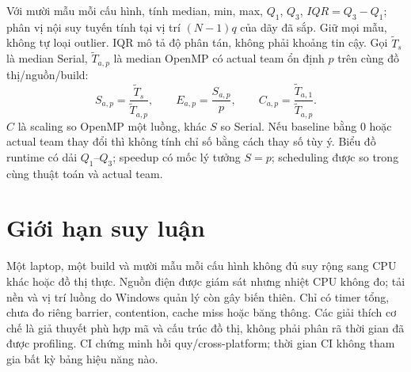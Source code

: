 Với mười mẫu mỗi cấu hình, tính median, min, max, $Q_1$, $Q_3$, $IQR=Q_3-Q_1$; phân vị nội suy tuyến tính tại vị trí $(N-1)q$ của dãy đã sắp. Giữ mọi mẫu, không tự loại outlier. IQR mô tả độ phân tán, không phải khoảng tin cậy. Gọi $\widetilde T_s$ là median Serial, $\widetilde T_{a,p}$ là median OpenMP có actual team ổn định $p$ trên cùng đồ thị/nguồn/build:
\[
S_{a,p}=\frac{\widetilde T_s}{\widetilde T_{a,p}},\qquad
E_{a,p}=\frac{S_{a,p}}p,\qquad
C_{a,p}=\frac{\widetilde T_{a,1}}{\widetilde T_{a,p}}.
\]
$C$ là scaling so OpenMP một luồng, khác $S$ so Serial. Nếu baseline bằng 0 hoặc actual team thay đổi thì không tính chỉ số bằng cách thay số tùy ý. Biểu đồ runtime có dải $Q_1$--$Q_3$; speedup có mốc lý tưởng $S=p$; scheduling được so trong cùng thuật toán và actual team.

\section{Giới hạn suy luận}
Một laptop, một build và mười mẫu mỗi cấu hình không đủ suy rộng sang CPU khác hoặc đồ thị thực. Nguồn điện được giám sát nhưng nhiệt CPU không đo; tải nền và vị trí luồng do Windows quản lý còn gây biến thiên. Chỉ có timer tổng, chưa đo riêng barrier, contention, cache miss hoặc băng thông. Các giải thích cơ chế là giả thuyết phù hợp mã và cấu trúc đồ thị, không phải phân rã thời gian đã được profiling. CI chứng minh hồi quy/cross-platform; thời gian CI không tham gia bất kỳ bảng hiệu năng nào.
